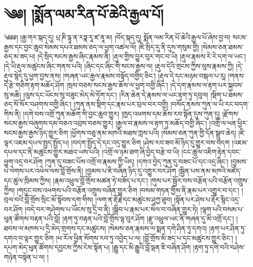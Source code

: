 \setcounter{footnote}{0} 
\chapter{༄༅། །སྨོན་ལམ་རིན་པོ་ཆེའི་རྒྱལ་པོ།}༄༅༅། །རྒྱ་གར་སྐད་དུ། པྲ་ཎི་དྷཱ་ན་རཏྣ་རཱ་ཛ་ནཱ་མ། །བོད་སྐད་དུ། སྨོན་ལམ་རིན་པོ་ཆེའི་རྒྱལ་པོ་ཞེས་བྱ་བ། སངས་རྒྱས་དང་བྱང་ཆུབ་སེམས་དཔའ་ཐམས་ཅད་ལ་ཕྱག་འཚལ་ལོ། །ཇི་སྲིད་དུ་ནི་དུས་གསུམ་གྱི། །སེམས་ཅན་ཐམས་ཅད་མ་ཟད་པ། །དེ་སྲིད་སངས་རྒྱས་ཞིང་རྣམས་ནི། །རྡུལ་གྱིས་བྱུར་བུར་གང་བ་ཡི། །རྡུལ་རྣམས་རེ་རེ་དག་ལ་ཡང་། །དེ་ཡི་རྡུལ་མཚུངས་ཞིང་གནས་པའི། །ཞིང་དང་ཞིང་གི་སངས་རྒྱས་ལ། །རྡུལ་དེའི་གྲངས་ཀྱིས་ལུས་རྣམས་ཀྱི། །དེ་རྡུལ་སྙེད་དུ་ཕྱག་བྱས་ནས། །གཞན་ཡང་རྒྱལ་རྣམས་བསྟོད་བགྱིད་ཅིང་། །རྡུལ་དེ་དང་མཉམ་བསྐལ་པ་རུ། །གནས་དེ་རྩེ་གཅིག་རྟག་མཆོད་ཤོག །སྲས་བཅས་སངས་རྒྱས་ཆོས་ལ་ཕྱག་བགྱི་ཞིང་། །དེ་དག་རྣམས་ལ་རྟག་པར་སྐྱབས་སུ་མཆི། །ལུས་དང་ཡོངས་སུ་བཟུང་མེད་མེ་ཏོག་དང་། །རིན་ཆེན་དེ་རྣམས་ལ་ཡང་རྟག་ཏུ་དབུལ། །སྡིག་པ་ཐམས་ཅད་སོ་སོར་བཤགས་བགྱི་ཞིང་། །ཀུན་ནས་སྡིག་དང་རྣམ་པར་བྲལ་བར་བགྱི། །བསོད་ནམས་ཀུན་ལ་ཡི་རང་བདག་གིས་ནི། །དགེ་བས་འགྲོ་ཀུན་མཆོག་གི་བྱང་ཆུབ་གྱུར། །ཁྱད་འཕགས་དམ་ཆོས་རབ་སྟོན་དུས་ཀུན་དུ། །རྫོགས་སངས་རྒྱས་བཞུགས་དམ་བཅའ་འབྲས་བཅས་གྱུར། །རྒྱལ་བ་རྣམས་ལ་རྟག་ཏུ་མཆོད་བགྱི་ཞིང་། །འགྲོ་ལ་ཕན་ཕྱིར་སངས་རྒྱས་རྒྱས་ཉིད་གྱུར་ཅིག །ཕྱོགས་བཅུ་ནམ་མཁའི་མཐས་ཀླས་པའི། །སེམས་ཅན་ཀུན་གྱི་དོན་སྒྲུབ་ཆེད། །ཇི་ལྟར་འཇམ་དཔལ་སྤྱད་སྤྱོད་པ། །བདག་སྤྱོད་དེ་དང་འདྲ་གྱུར་ཅིག །ཤེས་རབ་ཟབ་མོ་ཉིད་དུ་གྱུར་བས་བདག །འཇམ་དཔལ་དང་ནི་མཚུངས་གྱུར་མཐའ་ཡས་པའི། །འགྲོ་ལ་ཉམ་ཐག་ཞི་བྱེད་བརྩེ་བ་ཡི། །ངང་ཚུལ་འཇིག་རྟེན་དབང་ཕྱུག་འདྲ་བར་ཤོག །ཀུན་དུ་བཟང་པོས་འགྲོ་བ་རྣམས་ཀྱི་ཡིད། །དགའ་བྱེད་ཀུན་དུ་བཟང་པོ་དང་འདྲ་ཞིང་། །བྱམས་པ་ལེགས་པར་འཕེལ་ལས་བློ་གྲོས་ནི། །བྱམས་པ་ཇི་བཞིན་ཉིད་དུ་འགྱུར་བར་ཤོག །སྦྱིན་པས་ནམ་མཁའི་མཛོད་དང་ཚུལ་ཁྲིམས་ཀྱིས། །རྣམ་འཕྲུལ་བློ་གྲོས་མཚན་ཏེ་བཟོད་པ་དང་། །གུས་པར་སྦྱོར་བས་བརྩོན་པའི་བརྩོན་འགྲུས་ཀྱིས། །གདུང་བས་འཕགས་པའི་བརྩོན་འགྲུས་བཞིན་གྱུར་ཅིག །བསམ་གཏན་གྱིས་ནི་རྣམ་པར་འགྱུར་བ་དང་། །བྲལ་བའི་བློ་གྲོས་སྲིང་མོ་སྟོབས་དག་གིས། །ལག་ན་རྡོ་རྗེ་དང་མཚུངས་ཤཱཀྱ་ཐུབ། །སྟོན་པར་ཤེས་པ་རྡོར་སྙིང་འདྲ་བར་ཤོག །བདེ་བར་གཤེགས་པ་ཡོངས་སུ་དྲི་བ་ནི། །སྒྲིབ་པ་རྣམ་པར་སེལ་བ་བཞིན་གྱུར་ཏེ། །ལྷག་པའི་བསམ་པ་ཕུན་ཚོགས་བརྟན་པའི་བློ། །རྟག་ཏུ་བརྟན་པའི་བློ་གྲོས་ལྟ་བུར་ཤོག །རྫུ་འཕྲུལ་ཡང་ནི་གཞན་དུ་མི་འགྲོ་དང་། །ཐབས་ལ་མཁས་པ་དྲི་མེད་གྲགས་དང་མཚུངས། །སེམས་ཅན་རྣམས་ལ་སྨན་དགེ་ཤིན་ཏུ་དགའ། །རྟག་པར་ཤིན་ཏུ་དགའ་བ་ལྟར་གྱུར་ཅིག །ཕ་རོལ་ཕྱིན་སོགས་རབ་ཏུ་འབྱེད་པ་ལ། །བློ་གྲོས་མི་ཟད་པ་དང་མཚུངས་གྱུར་ཅིང་། །དཔག་མེད་ཕུན་ཚོགས་དབྱངས་ཀྱིས་ངེས་སྟོན་པ། །རྒྱུ་དང་མི་རྒྱུའི་བློ་ལྡན་ཇི་བཞིན་ཤོག །རྟག་ཏུ་དགེ་བའི་བཤེས་གཉེན་བསྟེན་པ་ལ། །
